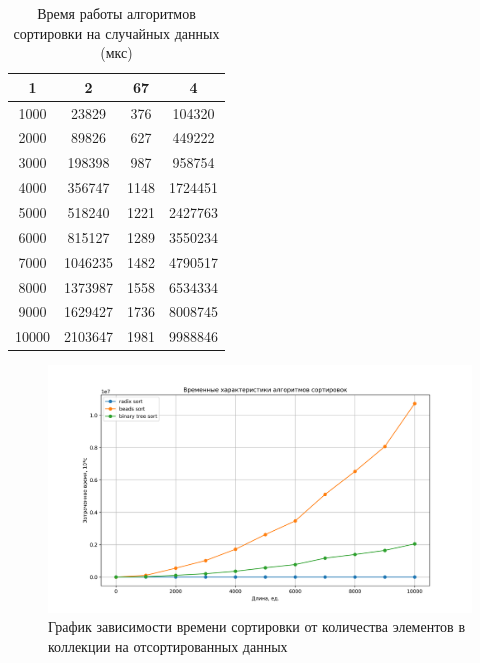 \begin{table}[h]
	\begin{center}
		\caption{ Время работы алгоритмов сортировки на случайных данных (мкс)}
		\label{tbl:random}
		\begin{tabular}{|c|c|c|c|}
			\hline
			1 & 2 & 67 & 4\\
			\hline
			1000 & 23829 & 376 & 104320\\
			\hline
			2000 & 89826 & 627 & 449222\\
			\hline
			3000 & 198398 & 987 & 958754\\
			\hline
			4000 & 356747 & 1148 & 1724451\\
			\hline
			5000 & 518240 & 1221 & 2427763\\
			\hline
			6000 & 815127 & 1289 & 3550234\\
			\hline
			7000 & 1046235 & 1482 & 4790517\\
			\hline
			8000 & 1373987 & 1558 & 6534334\\
			\hline
			9000 & 1629427 & 1736 & 8008745\\
			\hline
			10000 & 2103647 & 1981 & 9988846\\
			\hline
		\end{tabular}
	\end{center}
	
\end{table}
\clearpage

\begin{figure}[h!]
\centering
\includegraphics[width=1\linewidth]{inc/img/sort_time_graph_0.png}
\caption{График зависимости времени сортировки от количества элементов в коллекции на отсортированных данных}
\label{gra:sor}
\end{figure}

